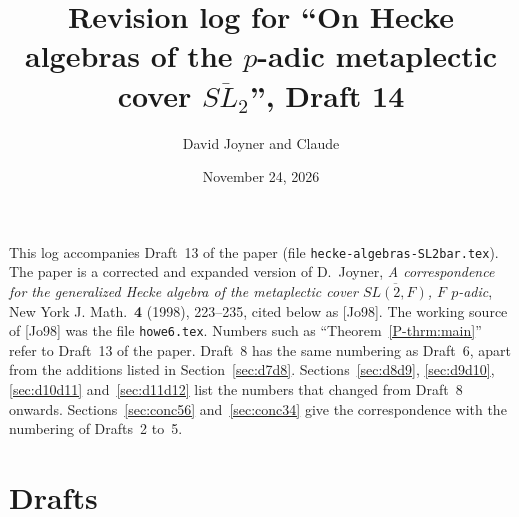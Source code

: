 \documentclass[12pt,letterpaper]{amsart}
\begin{document}
\title{Revision log for ``On Hecke algebras of the $p$-adic metaplectic
cover $\overline{SL_2}$'', Draft 14}
\author{David Joyner and Claude}
\date{November 24, 2026}
\maketitle

This log accompanies Draft~13 of the paper (file
\texttt{hecke-algebras-SL2bar.tex}). The paper is a corrected and
expanded version of D.~Joyner, \emph{A correspondence for the
generalized Hecke algebra of the metaplectic cover
$\overline{SL(2,F)}$, $F$ $p$-adic}, New York J. Math.\ \textbf{4}
(1998), 223--235, cited below as [Jo98]. The working source of [Jo98]
was the file \texttt{howe6.tex}. Numbers such as
``Theorem~\ref{P-thrm:main}'' refer to Draft~13 of the paper. Draft~8 has
the same numbering as Draft~6, apart from the additions listed in
Section~\ref{sec:d7d8}. Sections~\ref{sec:d8d9}, \ref{sec:d9d10}, \ref{sec:d10d11}
and~\ref{sec:d11d12} list the numbers that changed from Draft~8
onwards.
Sections~\ref{sec:conc56} and~\ref{sec:conc34} give the correspondence
with the numbering of Drafts~2 to~5.

\section{Drafts}
\end{document}
